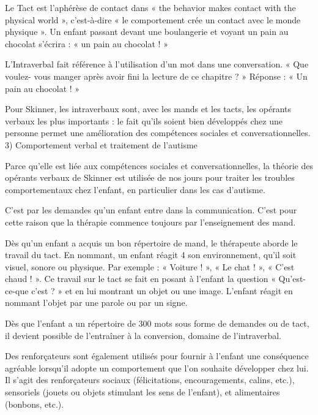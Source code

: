 Le Tact est l’aphérèse de contact dans « the behavior makes contact with the physical world », c’est-à-dire « le comportement crée un contact avec le monde physique ». Un enfant passant devant une boulangerie et voyant un pain au chocolat s’écrira : « un pain au chocolat ! »\par

L’Intraverbal fait référence à l’utilisation d’un mot dans une conversation. « Que voulez- vous manger après avoir fini la lecture de ce chapitre ? » Réponse : « Un pain au chocolat ! »\par

Pour Skinner, les intraverbaux sont, avec les mands et les tacts, les opérants verbaux les plus importants : le fait qu’ils soient bien développés chez une personne permet une amélioration des compétences sociales et conversationnelles. 3) Comportement verbal et traitement de l’autisme\par

Parce qu’elle est liée aux compétences sociales et conversationnelles, la théorie des opérants verbaux de Skinner est utilisée de nos jours pour traiter les troubles comportementaux chez l’enfant, en particulier dans les cas d’autisme.\par

C’est par les demandes qu’un enfant entre dans la communication. C’est pour cette raison que la thérapie commence toujours par l’enseignement des mand.\par

Dès qu’un enfant a acquis un bon répertoire de mand, le thérapeute aborde le travail du tact. En nommant, un enfant réagit 4 son environnement, qu’il soit visuel, sonore ou physique. Par exemple : « Voiture ! », « Le chat ! », « C’est chaud ! ». Ce travail sur le tact se fait en posant à l’enfant la question « Qu’est-ce-que c’est ? » et en lui montrant un objet ou une image. L’enfant réagit en nommant l’objet par une parole ou par un signe.\par

Dès que l’enfant a un répertoire de 300 mots sous forme de demandes ou de tact, il devient possible de l’entraîner à la conversion, domaine de l’intraverbal.\par

Des renforçateurs sont également utilisés pour fournir à l’enfant une conséquence agréable lorsqu’il adopte un comportement que l’on souhaite développer chez lui. Il s’agit des renforçateurs sociaux (félicitations, encouragements, calins, etc.), sensoriels (jouets ou objets stimulant les sens de l’enfant), et alimentaires (bonbons, etc.).\par

